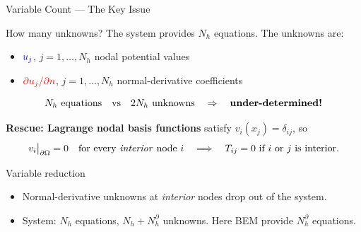 \documentclass[aspectratio=169]{beamer}
\begin{document}
\begin{frame}{Variable Count — The Key Issue}

  \begin{block}{How many unknowns?}
    The system provides $N_h$ equations. The unknowns are:
    \begin{itemize}
      \item $\textcolor{blue}{u_j}$, $j=1,\ldots,N_h$ \quad nodal potential values
      \item $\textcolor{red}{\partial u_j/\partial n}$, $j=1,\ldots,N_h$ \quad
            normal-derivative coefficients
    \end{itemize}
    \[
      N_h \text{ equations} \quad \text{vs} \quad 2N_h \text{ unknowns}
      \quad \Rightarrow \quad \text{\textbf{under-determined!}}
    \]
  \end{block}

  \medskip
  \textbf{Rescue: Lagrange nodal basis functions} satisfy $v_i(x_j)=\delta_{ij}$, so
  \[
    v_i\big|_{\partial\Omega} = 0 \quad \text{for every \emph{interior} node } i
    \quad\Longrightarrow\quad
    T_{ij} = 0 \text{ if } i \text{ or } j \text{ is interior.}
  \]

  \medskip
  \begin{alertblock}{Variable reduction}
    \begin{itemize}
      \item Normal-derivative unknowns at \emph{interior} nodes drop out of the system.
      \item System: $N_h$ equations, $N_h + N_h^\partial$ unknowns.
            Here BEM provide $N_h^\partial$ equations.
    \end{itemize}
  \end{alertblock}
\end{frame}
\end{document}
